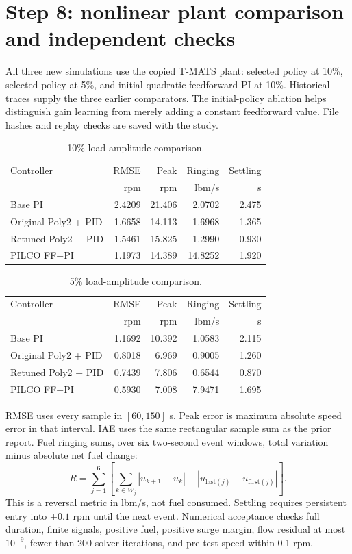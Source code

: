 \documentclass[11pt,a4paper]{article}
\begin{document}
\section{Step 8: nonlinear plant comparison and independent checks}
All three new simulations use the copied T-MATS plant: selected policy at 10\%, selected policy at 5\%, and initial quadratic-feedforward PI at 10\%. Historical traces supply the three earlier comparators. The initial-policy ablation helps distinguish gain learning from merely adding a constant feedforward value. File hashes and replay checks are saved with the study.

\begin{table}[H]\centering\small\begin{tabular}{lrrrr}\toprule Controller & RMSE & Peak & Ringing & Settling\\ & rpm & rpm & lbm/s & s\\\midrule
Base PI & 2.4209 & 21.406 & 2.0702 & 2.475 \\
Original Poly2 + PID & 1.6658 & 14.113 & 1.6968 & 1.365 \\
Retuned Poly2 + PID & 1.5461 & 15.825 & 1.2990 & 0.930 \\
PILCO FF+PI & 1.1973 & 14.389 & 14.8252 & 1.920 \\\bottomrule\end{tabular}\caption{10\% load-amplitude comparison.}\end{table}
\begin{table}[H]\centering\small\begin{tabular}{lrrrr}\toprule Controller & RMSE & Peak & Ringing & Settling\\ & rpm & rpm & lbm/s & s\\\midrule
Base PI & 1.1692 & 10.392 & 1.0583 & 2.115 \\
Original Poly2 + PID & 0.8018 & 6.969 & 0.9005 & 1.260 \\
Retuned Poly2 + PID & 0.7439 & 7.806 & 0.6544 & 0.870 \\
PILCO FF+PI & 0.5930 & 7.008 & 7.9471 & 1.695 \\\bottomrule\end{tabular}\caption{5\% load-amplitude comparison.}\end{table}

RMSE uses every sample in $[60,150]$ s. Peak error is maximum absolute speed error in that interval. IAE uses the same rectangular sample sum as the prior report. Fuel ringing sums, over six two-second event windows, total variation minus absolute net fuel change:
\begin{equation}
 R=\sum_{j=1}^{6}\left[\sum_{k\in W_j}|u_{k+1}-u_k|-|u_{\mathrm{last}(j)}-u_{\mathrm{first}(j)}|\right].
\end{equation}
This is a reversal metric in lbm/s, not fuel consumed. Settling requires persistent entry into $\pm0.1$ rpm until the next event. Numerical acceptance checks full duration, finite signals, positive fuel, positive surge margin, flow residual at most $10^{-9}$, fewer than 200 solver iterations, and pre-test speed within 0.1 rpm.
\end{document}
